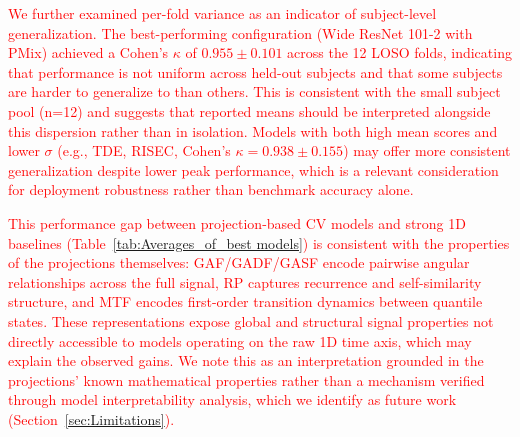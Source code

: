 \documentclass[final,3p,times,twocolumn]{elsarticle}
\newcommand{\red}[1]{\textcolor{red}{#1}}
\begin{document}
\red{We further examined per-fold variance as an indicator of subject-level generalization. The best-performing configuration (Wide ResNet 101-2 with \gls{PMix}) achieved a Cohen's $\kappa$ of $0.955 \pm 0.101$ across the 12 \gls{LOSO} folds, indicating that performance is not uniform across held-out subjects and that some subjects are harder to generalize to than others. This is consistent with the small subject pool (n=12) and suggests that reported means should be interpreted alongside this dispersion rather than in isolation. Models with both high mean scores and lower $\sigma$ (e.g., TDE, RISEC, Cohen's $\kappa = 0.938 \pm 0.155$) may offer more consistent generalization despite lower peak performance, which is a relevant consideration for deployment robustness rather than benchmark accuracy alone.}

\red{This performance gap between projection-based \gls{CV} models and strong 1D baselines (Table~\ref{tab:Averages_of_best models}) is consistent with the properties of the projections themselves: GAF/GADF/GASF encode pairwise angular relationships across the full signal, \gls{RP} captures recurrence and self-similarity structure, and \gls{MTF} encodes first-order transition dynamics between quantile states.
These representations expose global and structural signal properties not directly accessible to models operating on the raw 1D time axis, which may explain the observed gains. We note this as an interpretation grounded in the projections' known mathematical properties rather than a mechanism verified through model interpretability analysis, which we identify as future work (Section~\ref{sec:Limitations}).}






\end{document}
